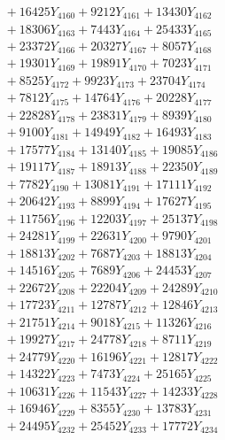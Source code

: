 \documentclass[a4paper,10pt]{article}
\begin{document}
{\begin{align}
&\;  + 16425 Y_{4160} + 9212 Y_{4161} + 13430 Y_{4162} \\[0.3ex]
&\;  + 18306 Y_{4163} + 7443 Y_{4164} + 25433 Y_{4165} \\[0.3ex]
&\;  + 23372 Y_{4166} + 20327 Y_{4167} + 8057 Y_{4168} \\[0.5ex]\allowbreak
&\;  + 19301 Y_{4169} + 19891 Y_{4170} + 7023 Y_{4171} \\[0.3ex]
&\;  + 8525 Y_{4172} + 9923 Y_{4173} + 23704 Y_{4174} \\[0.3ex]
&\;  + 7812 Y_{4175} + 14764 Y_{4176} + 20228 Y_{4177} \\[0.3ex]
&\;  + 22828 Y_{4178} + 23831 Y_{4179} + 8939 Y_{4180} \\[0.3ex]
&\;  + 9100 Y_{4181} + 14949 Y_{4182} + 16493 Y_{4183} \\[0.3ex]
&\;  + 17577 Y_{4184} + 13140 Y_{4185} + 19085 Y_{4186} \\[0.3ex]
&\;  + 19117 Y_{4187} + 18913 Y_{4188} + 22350 Y_{4189} \\[0.3ex]
&\;  + 7782 Y_{4190} + 13081 Y_{4191} + 17111 Y_{4192} \\[0.3ex]
&\;  + 20642 Y_{4193} + 8899 Y_{4194} + 17627 Y_{4195} \\[0.3ex]
&\;  + 11756 Y_{4196} + 12203 Y_{4197} + 25137 Y_{4198} \\[0.5ex]\allowbreak
&\;  + 24281 Y_{4199} + 22631 Y_{4200} + 9790 Y_{4201} \\[0.3ex]
&\;  + 18813 Y_{4202} + 7687 Y_{4203} + 18813 Y_{4204} \\[0.3ex]
&\;  + 14516 Y_{4205} + 7689 Y_{4206} + 24453 Y_{4207} \\[0.3ex]
&\;  + 22672 Y_{4208} + 22204 Y_{4209} + 24289 Y_{4210} \\[0.3ex]
&\;  + 17723 Y_{4211} + 12787 Y_{4212} + 12846 Y_{4213} \\[0.3ex]
&\;  + 21751 Y_{4214} + 9018 Y_{4215} + 11326 Y_{4216} \\[0.3ex]
&\;  + 19927 Y_{4217} + 24778 Y_{4218} + 8711 Y_{4219} \\[0.3ex]
&\;  + 24779 Y_{4220} + 16196 Y_{4221} + 12817 Y_{4222} \\[0.3ex]
&\;  + 14322 Y_{4223} + 7473 Y_{4224} + 25165 Y_{4225} \\[0.3ex]
&\;  + 10631 Y_{4226} + 11543 Y_{4227} + 14233 Y_{4228} \\[0.5ex]\allowbreak
&\;  + 16946 Y_{4229} + 8355 Y_{4230} + 13783 Y_{4231} \\[0.3ex]
&\;  + 24495 Y_{4232} + 25452 Y_{4233} + 17772 Y_{4234} \\[0.3ex]

\end{align}}
\end{document}
